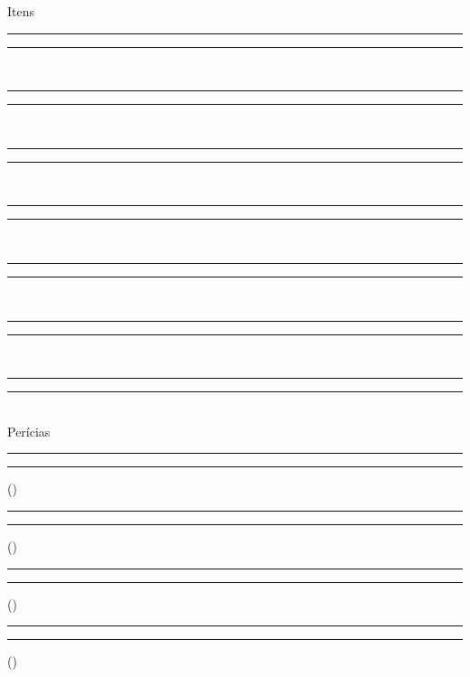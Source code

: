 \documentclass[a4paper,12pt]{article}
\begin{document}
	\begin{minipage}[t][][t]{.49\linewidth}
		{\centering Itens \\}
		\vspace{.14cm}
		\rule{.49\linewidth}{.5pt}\hspace{.01\linewidth}\rule{.49\linewidth}{.5pt}\\
		\rule{.49\linewidth}{.5pt}\hspace{.01\linewidth}\rule{.49\linewidth}{.5pt}\\
		\rule{.49\linewidth}{.5pt}\hspace{.01\linewidth}\rule{.49\linewidth}{.5pt}\\
		\rule{.49\linewidth}{.5pt}\hspace{.01\linewidth}\rule{.49\linewidth}{.5pt}\\
		\rule{.49\linewidth}{.5pt}\hspace{.01\linewidth}\rule{.49\linewidth}{.5pt}\\
		\rule{.49\linewidth}{.5pt}\hspace{.01\linewidth}\rule{.49\linewidth}{.5pt}\\
		\rule{.49\linewidth}{.5pt}\hspace{.01\linewidth}\rule{.49\linewidth}{.5pt}\vspace{.6cm}\\
		\centering Perícias \\
		\rule{24pt}{.5pt}
		\rule{.66\linewidth}{.5pt}(\hspace{.05\linewidth}) \\
		\rule{24pt}{.5pt}
		\rule{.66\linewidth}{.5pt}(\hspace{.05\linewidth}) \\
		\rule{24pt}{.5pt}
		\rule{.66\linewidth}{.5pt}(\hspace{.05\linewidth}) \\
		\rule{24pt}{.5pt}
		\rule{.66\linewidth}{.5pt}(\hspace{.05\linewidth}) \\

\end{minipage}
\end{document}
